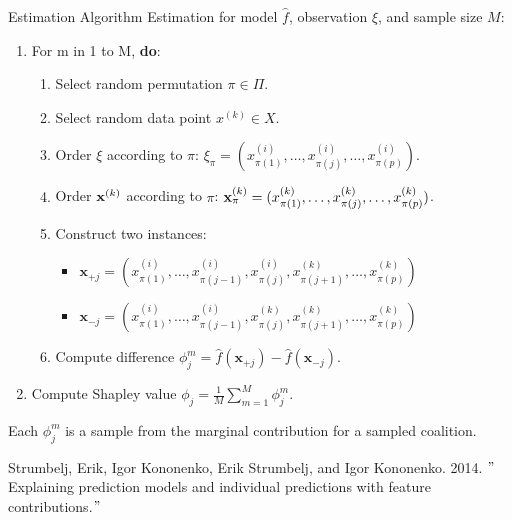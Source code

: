 \documentclass[aspectratio=169]{../latex_main/tntbeamer}  %
\begin{document}
\begin{frame}{Estimation Algorithm}
Estimation for model $\hat{f}$, observation $\xi$, and sample size $M$:
  \begin{enumerate}
      \item For m in 1 to M, \textbf{do}:
      \begin{enumerate}
        \item Select random permutation $\pi \in \Pi$.
        \item Select random data point $x^{(k)} \in X$.
        \item Order $\xi$ according to $\pi$: $\xi_{\pi} = (x^{(i)}_{\pi(1)}, \ldots, x^{(i)}_{\pi(j)}, \ldots, x^{(i)}_{\pi(p)})$.
        \item Order $\mathbf{x}^{(k)}$ according to $\pi$: $\mathbf{x}^{(k)}_{\pi} = (x^{(k)}_{\pi(1)}, \ldots, x^{(k)}_{\pi(j)}, \ldots, x^{(k)}_{\pi(p)})$.
        \item Construct two instances:
          \begin{itemize}
            \item $\mathbf{x}_{+j} = (x^{(i)}_{\pi(1)}, \ldots, x^{(i)}_{\pi(j - 1)}, x^{(i)}_{\pi(j)}, x^{(k)}_{\pi(j + 1)}, \ldots, x^{(k)}_{\pi(p)}) $
            \item $\mathbf{x}_{-j} = (x^{(i)}_{\pi(1)}, \ldots, x^{(i)}_{\pi(j - 1)}, x^{(k)}_{\pi(j)}, x^{(k)}_{\pi(j + 1)}, \ldots, x^{(k)}_{\pi(p)}) $
          \end{itemize}
        \item Compute difference $\phi_j^m = \hat{f}(\mathbf{x}_{+j}) - \hat{f}(\mathbf{x}_{-j})$.
      \end{enumerate}
    \item Compute Shapley value $\phi_j = \frac{1}{M}\sum_{m=1}^M \phi_j^m$.
  \end{enumerate}

  Each $\phi_j^m$ is a sample from the marginal contribution for a sampled coalition.

  \tiny{Strumbelj, Erik, Igor Kononenko, Erik Strumbelj, and Igor Kononenko. 2014. $"$Explaining prediction models and individual predictions with feature contributions.$"$}

\end{frame}
\end{document}
